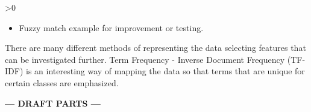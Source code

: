 \ifnum\printdraft>0
	\begin{itemize}
		\item Fuzzy match example for improvement or testing.
	\end{itemize}
	There are many different methods of representing the data selecting features that can be investigated further. Term Frequency - Inverse Document Frequency (TF-IDF) is an interesting way of mapping the data so that terms that are unique for certain classes are emphasized.
\else
\begin{center}
	\textbf{--- DRAFT PARTS ---}
\end{center}
\fi
